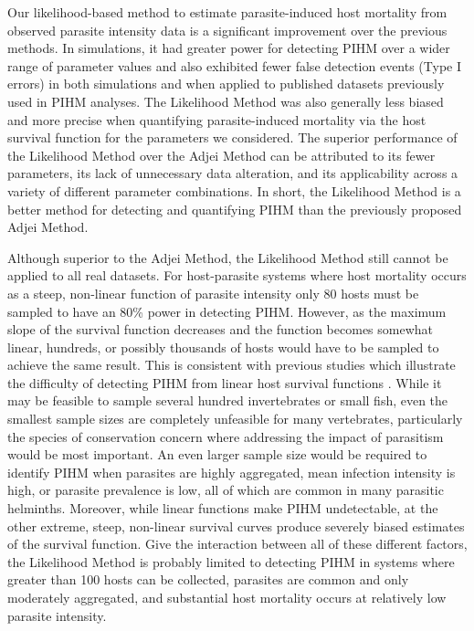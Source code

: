 \documentclass[12pt, a4paper]{article}
\begin{document}
Our likelihood-based method to estimate parasite-induced host mortality from
observed parasite intensity data is a significant improvement over the previous
methods.  In simulations, it had greater power for detecting PIHM over a wider
range of parameter values and also exhibited fewer false detection events (Type
I errors) in both simulations and when applied to published datasets previously
used in PIHM analyses. The Likelihood Method was also generally less biased and
more precise when quantifying parasite-induced mortality via the host survival
function for the parameters we considered.  The superior performance of the
Likelihood Method over the Adjei Method can be attributed to its fewer
parameters, its lack of unnecessary data alteration, and its applicability
across a variety of different parameter combinations. In short, the Likelihood
Method is a better method for detecting and quantifying PIHM than the
previously proposed Adjei Method.

Although superior to the Adjei Method, the Likelihood Method still cannot be applied to all real datasets. For host-parasite systems where host mortality occurs as a steep, non-linear function of parasite intensity only 80 hosts must be sampled to have an 80\% power in detecting PIHM. However, as the maximum slope of the survival function decreases and the function becomes somewhat linear, hundreds, or possibly thousands of hosts would have to be sampled to achieve the same result. This is consistent with previous studies which illustrate the difficulty of detecting PIHM from linear host survival functions \citep{Lanciani1989}.  While it may be feasible to sample several hundred invertebrates or small fish, even the smallest sample sizes are completely
unfeasible for many vertebrates, particularly the species of conservation
concern where addressing the impact of parasitism would be most important. An
even larger sample size would be required to identify PIHM when parasites are highly aggregated, mean infection intensity is
high, or parasite prevalence is low, all of which are
common in many parasitic helminths. Moreover, while linear functions make PIHM undetectable, at the other extreme, steep,
non-linear survival curves produce severely biased estimates of the survival
function. Give the interaction between all of these different factors, the
Likelihood Method is probably limited to detecting PIHM in systems where greater than 100 hosts can be collected, parasites are
common and only moderately aggregated, and substantial host mortality occurs at relatively low parasite intensity.
\end{document}
